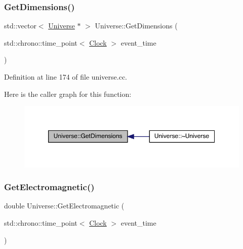 \subsubsection{\texorpdfstring{Get\+Dimensions()}{GetDimensions()}}
{\footnotesize\ttfamily std\+::vector$<$ \hyperlink{class_universe}{Universe} $\ast$ $>$ Universe\+::\+Get\+Dimensions (\begin{DoxyParamCaption}\item[{std\+::chrono\+::time\+\_\+point$<$ \hyperlink{universe_8h_a0ef8d951d1ca5ab3cfaf7ab4c7a6fd80}{Clock} $>$}]{event\+\_\+time }\end{DoxyParamCaption})}



Definition at line 174 of file universe.\+cc.

Here is the caller graph for this function\+:
\nopagebreak
\begin{figure}[H]
\begin{center}
\leavevmode
\includegraphics[width=350pt]{class_universe_a1869fc7bf43827378bab5a701f7f917a_icgraph}
\end{center}
\end{figure}
\mbox{\label{class_universe_a63b850ef3f3394313353109d222bf5d1}} 
\subsubsection{\texorpdfstring{Get\+Electromagnetic()}{GetElectromagnetic()}}
{\footnotesize\ttfamily double Universe\+::\+Get\+Electromagnetic (\begin{DoxyParamCaption}\item[{std\+::chrono\+::time\+\_\+point$<$ \hyperlink{universe_8h_a0ef8d951d1ca5ab3cfaf7ab4c7a6fd80}{Clock} $>$}]{event\+\_\+time }\end{DoxyParamCaption})\hspace{0.3cm}{\ttfamily [virtual]}}



